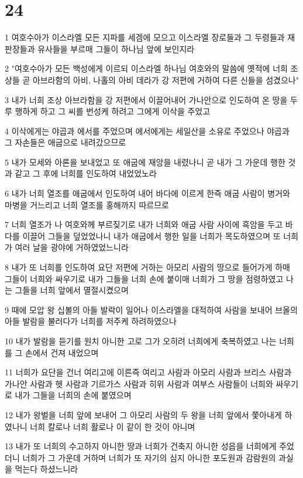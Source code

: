\chapter{24}

\par 1 여호수아가 이스라엘 모든 지파를 세겜에 모으고 이스라엘 장로들과 그 두령들과 재판장들과 유사들을 부르매 그들이 하나님 앞에 보인지라
\par 2 "여호수아가 모든 백성에게 이르되 이스라엘 하나님 여호와의 말씀에 옛적에 너희 조상들 곧 아브라함의 아비, 나홀의 아비 데라가 강 저편에 거하여 다른 신들을 섬겼으나"
\par 3 내가 너희 조상 아브라함을 강 저편에서 이끌어내어 가나안으로 인도하여 온 땅을 두루 행하게 하고 그 씨를 번성케 하려고 그에게 이삭을 주었고
\par 4 이삭에게는 야곱과 에서를 주었으며 에서에게는 세일산을 소유로 주었으나 야곱과 그 자손들은 애굽으로 내려갔으므로
\par 5 내가 모세와 아론을 보내었고 또 애굽에 재앙을 내렸나니 곧 내가 그 가운데 행한 것과 같고 그 후에 너희를 인도하여 내었었노라
\par 6 내가 너희 열조를 애굽에서 인도하여 내어 바다에 이르게 한즉 애굽 사람이 병거와 마병을 거느리고 너희 열조를 홍해까지 따르므로
\par 7 너희 열조가 나 여호와께 부르짖기로 내가 너희와 애굽 사람 사이에 흑암을 두고 바다를 이끌어 그들을 덮었었나니 내가 애굽에서 행한 일을 너희가 목도하였으며 또 너희가 여러 날을 광야에 거하였었느니라
\par 8 내가 또 너희를 인도하여 요단 저편에 거하는 아모리 사람의 땅으로 들어가게 하매 그들이 너희와 싸우기로 내가 그들을 너희 손에 붙이매 너희가 그 땅을 점령하였고 나는 그들을 너희 앞에서 멸절시켰으며
\par 9 때에 모압 왕 십볼의 아들 발락이 일어나 이스라엘을 대적하여 사람을 보내어 브올의 아들 발람을 불러다가 너희를 저주케 하려하였으나
\par 10 내가 발람을 듣기를 원치 아니한 고로 그가 오히려 너희에게 축복하였고 나는 너희를 그 손에서 건져 내었으며
\par 11 너희가 요단을 건너 여리고에 이른즉 여리고 사람과 아모리 사람과 브리스 사람과 가나안 사람과 헷 사람과 기르가스 사람과 히위 사람과 여부스 사람들이 너희와 싸우기로 내가 그들을 너희의 손에 붙였으며
\par 12 내가 왕벌을 너희 앞에 보내어 그 아모리 사람의 두 왕을 너희 앞에서 쫓아내게 하였나니 너희 칼로나 너희 활로나 이 같이 한 것이 아니며
\par 13 내가 또 너희의 수고하지 아니한 땅과 너희가 건축지 아니한 성읍을 너희에게 주었더니 너희가 그 가운데 거하며 너희가 또 자기의 심지 아니한 포도원과 감람원의 과실을 먹는다 하셨느니라
